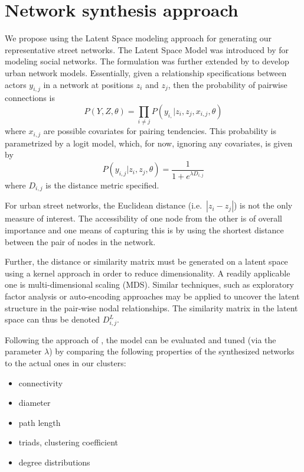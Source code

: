 \documentclass[11pt,twoside]{article}
\numberwithin{equation}{section}
\newcommand{\?}{\stackrel{?}{=}}
\begin{document}
\section{Network synthesis approach}
We propose using the Latent Space modeling approach for generating our representative street networks.
The Latent Space Model was introduced by \textcite{hoff2002latent} for modeling social networks.
The formulation was further extended by \cite{zhou2015generating} to develop urban network models.
Essentially, given a relationship specifications between actors $y_{i,j}$ in a network at positions $z_i$ and $z_j$,
then the probability of pairwise connections is
\begin{equation}
  \label{eq:1}
  P(Y, Z, \theta) = \prod_{i\ne j} P(y_{i,}|z_i, z_j, x_{i,j},\theta)
\end{equation}
where $x_{i,j}$ are possible covariates for pairing tendencies.
This probability is parametrized by a logit model, which, for now, ignoring any covariates, is given by
\begin{equation}
  \label{eq:2}
  P(y_{i,j}|z_i,z_j,\theta) = \frac{1}{1+e^{\lambda D_{i,j}}}
\end{equation}
where $D_{i,j}$ is the distance metric specified.

For urban street networks, the Euclidean distance (i.e.\ $|z_i - z_j|$) is not the only measure of interest.
The accessibility of one node from the other is of overall importance and one means of capturing this is by using the shortest distance between the pair of nodes in the network.

Further, the distance or similarity matrix must be generated on a latent space using a kernel approach in order to reduce dimensionality.
A readily applicable one is multi-dimensional scaling (MDS).
Similar techniques, such as exploratory factor analysis or auto-encoding approaches may be applied to uncover the latent structure in the pair-wise nodal relationships.
The similarity matrix in the latent space can thus be denoted $D_{i,j}^L$.

Following the approach of \cite{zhou2015generating}, the model can be evaluated and tuned (via the parameter $\lambda$) by comparing the following properties of the synthesized networks to the actual ones in our clusters:
\begin{itemize}
\item connectivity
\item diameter
\item path length
\item triads, clustering coefficient
\item degree distributions
\end{itemize}
\end{document}
